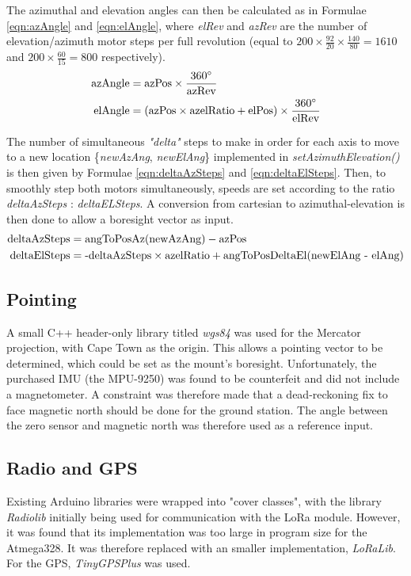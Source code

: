 \noindent The azimuthal and elevation angles can then be calculated as in Formulae \ref{eqn:azAngle} and \ref{eqn:elAngle}, where \textit{elRev} and \textit{azRev} are the number of elevation/azimuth motor steps per full revolution (equal to $200 \times \frac{92}{20} \times \frac{140}{80} = 1610$ and $200 \times \frac{60}{15} = 800$ respectively).
\begin{align}
    \textnormal{azAngle} &= \textnormal{azPos} \times \frac{360 ^{\circ}}{\textnormal{azRev}} \label{eqn:azAngle} \\
    \textnormal{elAngle} &= (\textnormal{azPos} \times \textnormal{azelRatio} + \textnormal{elPos}) \times \frac{360 ^{\circ}}{\textnormal{elRev}} \label{eqn:elAngle}
\end{align}

\noindent The number of simultaneous \textit{"delta"} steps to make in order for each axis to move to a new location \{\textit{newAzAng}, \textit{newElAng}\} implemented in \textit{setAzimuthElevation()} is then given by Formulae \ref{eqn:deltaAzSteps} and \ref{eqn:deltaElSteps}. Then, to smoothly step both motors simultaneously, speeds are set according to the ratio \textit{deltaAzSteps} : \textit{deltaELSteps}. A conversion from cartesian to azimuthal-elevation is then done to allow a boresight vector as input.
\begin{align}
    \textnormal{deltaAzSteps} &= \textnormal{angToPosAz(newAzAng)} - \textnormal{azPos} \label{eqn:deltaAzSteps} \\ 
    \textnormal{deltaElSteps} &= \textnormal{-deltaAzSteps} \times \textnormal{azelRatio} + \textnormal {angToPosDeltaEl(newElAng - elAng)}\label{eqn:deltaElSteps} 
\end{align}

\subsection{Pointing}
A small C++ header-only library titled \textit{wgs84} was used for the Mercator projection, with Cape Town as the origin. This allows a pointing vector to be determined, which could be set as the mount's boresight. Unfortunately, the purchased IMU (the MPU-9250) was found to be counterfeit and did not include a magnetometer. A constraint was therefore made that a dead-reckoning fix to face magnetic north should be done for the ground station. The angle between the zero sensor and magnetic north was therefore used as a reference input.

\subsection{Radio and GPS}
Existing Arduino libraries were wrapped into "cover classes", with the library \textit{Radiolib} initially being used for communication with the LoRa module. However, it was found that its implementation was too large in program size for the Atmega328. It was therefore replaced with an smaller implementation, \textit{LoRaLib}. For the GPS, \textit{TinyGPSPlus} was used.